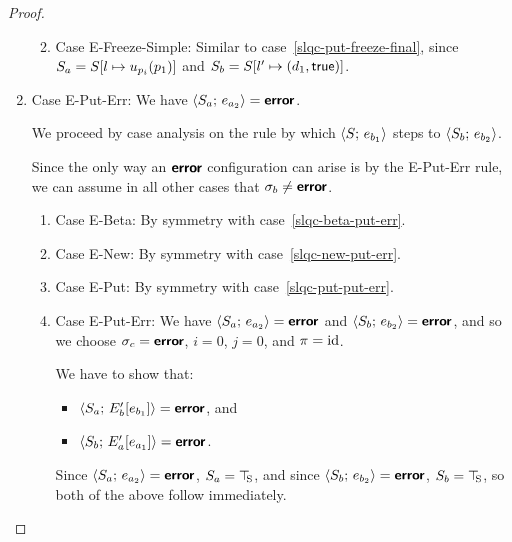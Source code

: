 \begin{proof}
\begin{enumerate}
\begin{enumerate}
\begin{itemize}
      \end{itemize}

    \item \label{slqc-put-freeze-simple}Case {\sc E-Freeze-Simple}:
      Similar to case~\ref{slqc-put-freeze-final}, since $S_a =
      S[l \mapsto u_{p_i}(p_1)]$ and $S_b =
      S[l' \mapsto (d_1, \textsf{true})]$.

    \end{enumerate}
  \item Case {\sc E-Put-Err}: We have $\langle S_a;\, e_{a_2} \rangle =
    \textbf{\textsf{error}}$.

    We proceed by case analysis on the rule by which
    $\langle S;\, e_{b_1} \rangle$ steps to $\langle S_b;\, e_{b_2} \rangle$.

    Since the only way an $\textbf{\textsf{error}}$ configuration can arise is by the
    {\sc E-Put-Err} rule, we can assume in all other cases that
    $\sigma_b \neq \textbf{\textsf{error}}$.
    \begin{enumerate}
    \item \label{slqc-put-err-beta}Case {\sc E-Beta}: By symmetry with case~\ref{slqc-beta-put-err}.
    \item \label{slqc-put-err-new}Case {\sc E-New}: By symmetry with case~\ref{slqc-new-put-err}.
    \item \label{slqc-put-err-put}Case {\sc E-Put}: By symmetry with case~\ref{slqc-put-put-err}.
    \item \label{slqc-put-err-put-err}Case {\sc E-Put-Err}: We have
      $\langle S_a;\, e_{a_2} \rangle = \textbf{\textsf{error}}$ and $\langle S_b;\, e_{b_2} \rangle =
      \textbf{\textsf{error}}$, and so we choose $\sigma_c = \textbf{\textsf{error}}$, $i = 0$, $j = 0$,
      and $\pi = \mathrm{id}$.

      We have to show that:
      \begin{itemize}
      \item $\langle S_a;\, E'_b\hspace{-0.5mm}\left[e_{b_1}\right] \rangle = \textbf{\textsf{error}}$, and
      \item $\langle S_b;\, E'_a\hspace{-0.5mm}\left[e_{a_1}\right] \rangle = \textbf{\textsf{error}}$.
      \end{itemize}

      Since $\langle S_a;\, e_{a_2} \rangle = \textbf{\textsf{error}}$, $S_a = \top\hspace{-0.85mm}_{\mathrm{S}}$, and since
      $\langle S_b;\, e_{b_2} \rangle = \textbf{\textsf{error}}$, $S_b = \top\hspace{-0.85mm}_{\mathrm{S}}$, so both of the
      above follow immediately.


\end{enumerate}
\end{enumerate}
\end{proof}
